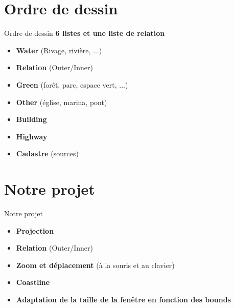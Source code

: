 \documentclass[french]{beamer}
\begin{document}
\section{Ordre de dessin}
\begin{frame}{Ordre de dessin}
	 \textbf{6 listes et une liste de relation}
	 \begin{itemize}
	 \item<2-8> \textbf{Water} (Rivage, rivière, ...)
 	 \item<3-8> \textbf{Relation} (Outer/Inner)
	 \item<4-8> \textbf{Green} (forêt, parc, espace vert, ...)
	 \item<5-8> \textbf{Other} (église, marina, pont) 
	 \item<6-8> \textbf{Building}
	 \item<7-8> \textbf{Highway} 
	 \item<8>     \textbf{Cadastre} (sources)

	\end{itemize}
\end{frame}

\section{Notre projet}
\begin{frame}{Notre projet}
	 \begin{itemize}
	 \item<1-5> \textbf{Projection}
 	 \item<2-5> \textbf{Relation} (Outer/Inner)
	 \item<3-5> \textbf{Zoom et déplacement} (à la souris et au clavier)
	 \item<4-5> \textbf{Coastline}
	 \item<5>	\textbf{Adaptation de la taille de la fenêtre en fonction des bounds }
	\end{itemize}
\end{frame}
\end{document}
